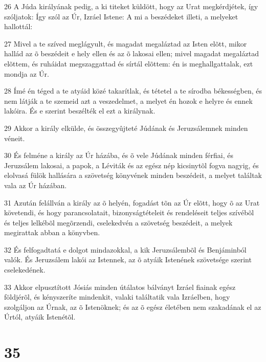\par 26 A Júda királyának pedig, a ki titeket küldött, hogy az Urat megkérdjétek, így szóljatok: Így szól az Úr, Izráel Istene: A mi a beszédeket illeti, a melyeket hallottál:
\par 27 Mivel a te szíved meglágyult, és magadat megaláztad az Isten elõtt, mikor hallád az õ beszédeit e hely ellen és az õ lakosai ellen; mivel magadat megaláztad elõttem, és ruháidat megszaggattad és sírtál elõttem: én is meghallgattalak, ezt mondja az Úr.
\par 28 Ímé én téged a te atyáid közé takarítlak, és tétetel a te sírodba békességben, és nem látják a te  szemeid azt a veszedelmet, a melyet én hozok e helyre és ennek lakóira. És e szerint beszélték el ezt a királynak.
\par 29 Akkor a király elkülde, és összegyûjteté Júdának és Jeruzsálemnek minden véneit.
\par 30 És felméne a király az Úr házába, és õ vele Júdának minden férfiai, és Jeruzsálem lakosai, a papok, a Léviták és az egész nép kicsinytõl fogva nagyig, és elolvasá fülök hallására a szövetség könyvének minden beszédeit, a melyet találtak vala az Úr házában.
\par 31 Azután felállván a király az õ helyén, fogadást tõn az Úr elõtt, hogy õ az Urat követendi, és hogy parancsolatait, bizonyságtételeit és rendeléseit teljes szívébõl és teljes lelkébõl megõrzendi, cselekedvén a szövetség beszédeit, a melyek megirattak abban a könyvben.
\par 32 És felfogadtatá e dolgot mindazokkal, a kik Jeruzsálembõl és Benjáminból valók. És Jeruzsálem lakói az Istennek, az õ atyáik Istenének szövetsége szerint cselekedének.
\par 33 Akkor elpusztított Jósiás minden útálatos  bálványt Izráel fiainak egész földjérõl, és kényszeríte mindenkit, valaki találtatik vala Izráelben, hogy szolgáljon az Úrnak, az õ Istenöknek; és az õ egész életében nem szakadának el az Úrtól, atyáik Istenétõl.

\chapter{35}

